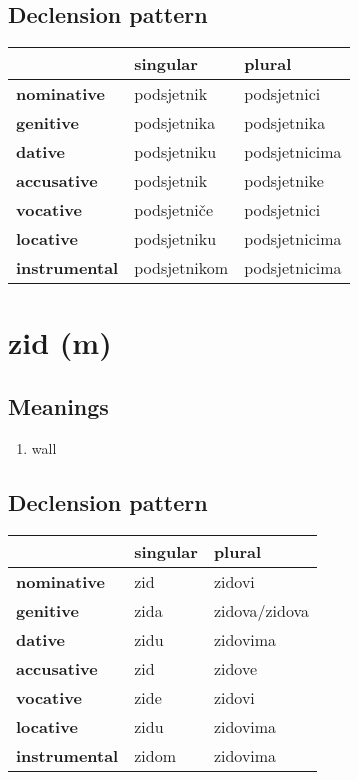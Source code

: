 \subsection*{Declension pattern}
\begin{tabularx}{\linewidth}{Xll}
\toprule
{} &      singular &         plural \\
\midrule
\textbf{nominative  } &    podsjetnik &    podsjetnici \\
\textbf{genitive    } &   podsjetnika &    podsjetnika \\
\textbf{dative      } &   podsjetniku &  podsjetnicima \\
\textbf{accusative  } &    podsjetnik &    podsjetnike \\
\textbf{vocative    } &   podsjetniče &    podsjetnici \\
\textbf{locative    } &   podsjetniku &  podsjetnicima \\
\textbf{instrumental} &  podsjetnikom &  podsjetnicima \\
\bottomrule
\end{tabularx}

\filbreak
\section{zid (m)}
\subsection*{Meanings}
\begin{enumerate}
\item wall
\end{enumerate}
\subsection*{Declension pattern}
\begin{tabularx}{\linewidth}{Xll}
\toprule
{} & singular &         plural \\
\midrule
\textbf{nominative  } &      zid &         zidovi \\
\textbf{genitive    } &     zida &  zidova/zidova \\
\textbf{dative      } &     zidu &       zidovima \\
\textbf{accusative  } &      zid &         zidove \\
\textbf{vocative    } &     zide &         zidovi \\
\textbf{locative    } &     zidu &       zidovima \\
\textbf{instrumental} &    zidom &       zidovima \\
\bottomrule
\end{tabularx}

